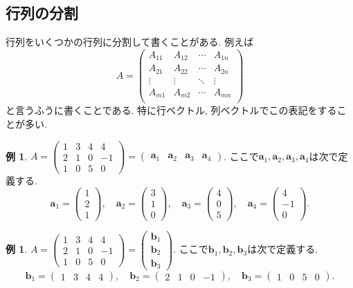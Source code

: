 \documentclass[dvipdfmx,a4paper,11pt]{article}
\theoremstyle{definition}
\newtheorem{exa}[thm]{例}
\begin{document}
\subsection{行列の分割 \cite[1.3節]{M}}
行列をいくつかの行列に分割して書くことがある.
例えば
$$
A = \begin{pmatrix}
A_{11}& A_{12} & \cdots &A_{1n}\\
A_{21}& A_{22} & \cdots &A_{2n}\\
\vdots& \vdots	&	\ddots   &	\vdots \\
A_{m1}& A_{m2} & \cdots &A_{mn} \\
\end{pmatrix}
$$
と言うふうに書くことである.
特に行ベクトル, 列ベクトルでこの表記をすることが多い.
\begin{exa}
$
A=
  \begin{pmatrix}
 1 &3&4&4 \\
 2&1&0&-1\\
 1&0&5&0
 \end{pmatrix}
 = 
   \begin{pmatrix}
\bm{a}_1&\bm{a}_2&\bm{a}_3&\bm{a}_4
 \end{pmatrix}
$.
ここで$\bm{a}_1, \bm{a}_2, \bm{a}_3, \bm{a}_4$は次で定義する. 
$$
\bm{a}_1 = 
  \begin{pmatrix}
 1 \\2 \\1
 \end{pmatrix},\quad
 \bm{a}_2 = 
  \begin{pmatrix}
 3 \\1 \\0
 \end{pmatrix},\quad
  \bm{a}_3 = 
  \begin{pmatrix}
 4 \\0 \\5
 \end{pmatrix},\quad
  \bm{a}_4 = 
  \begin{pmatrix}
 4 \\-1 \\0
 \end{pmatrix}.
$$
\end{exa}
\begin{exa}
$
A=
  \begin{pmatrix}
 1 &3&4&4 \\
 2&1&0&-1\\
 1&0&5&0
 \end{pmatrix}
 = 
   \begin{pmatrix}
\bm{b}_1\\ \bm{b}_2\\ \bm{b}_3
 \end{pmatrix}
$.
ここで$\bm{b}_1, \bm{b}_2, \bm{b}_3$は次で定義する. 
$$
\bm{b}_1 = 
  \begin{pmatrix}
 1 &3 &4&4
 \end{pmatrix},\quad
\bm{b}_2= 
  \begin{pmatrix}
 2&1 &0&-1
 \end{pmatrix},\quad
 \bm{b}_3 = 
  \begin{pmatrix}
 1 &0 &5&0
 \end{pmatrix}.
 $$
\end{exa}
\end{document}
